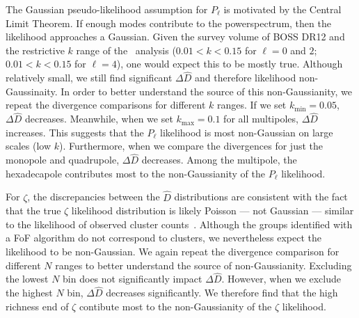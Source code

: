\documentclass[12pt, letterpaper, preprint]{aastex}
\newcommand{\Beut}{\citetalias{beutler2017}}
\begin{document}
The Gaussian pseudo-likelihood assumption for $P_\ell$ is motivated 
by the Central Limit Theorem. If enough modes contribute to the 
powerspectrum, then the likelihood approaches a Gaussian. Given the 
survey volume of BOSS DR12 and the restrictive $k$ range of the \Beut~analysis 
($0.01 < k < 0.15$ for $\ell = 0$ and $2$; $0.01 < k < 0.15$ for $\ell = 4$), 
one would expect this to be mostly true. Although relatively small, we
still find significant $\Delta \hat{D}$ and therefore likelihood non-Gaussinaity. 
In order to better understand the source of this non-Gaussianity, 
we repeat the divergence comparisons 
for different $k$ ranges. If we set $k_\mathrm{min} = 0.05$, $\Delta \hat{D}$ 
decreases. Meanwhile, when we set $k_\mathrm{max} = 0.1$ for all 
multipoles, $\Delta \hat{D}$ increases. This suggests that the $P_\ell$ 
likelihood is most non-Gaussian on large scales (low $k$). Furthermore,
when we compare the divergences for just the monopole and quadrupole, 
$\Delta \hat{D}$ decreases. Among the multipole, the hexadecapole 
contributes most to the non-Gaussianity of the $P_\ell$ likelihood. 

For $\zeta$, the discrepancies between the $\hat{D}$ distributions 
are consistent with the fact that the true $\zeta$ likelihood 
distribution is likely Poisson --- not Gaussian --- similar to the likelihood 
of observed cluster counts~\citep{cash1979,planckcollaboration2014,ade2016}. 
Although the groups identified with a FoF algorithm do not correspond
to clusters, we nevertheless expect the likelihood to be non-Gaussian. 
We again repeat the divergence comparison for different $N$ ranges 
to better understand the source of non-Gaussianity. Excluding the 
lowest $N$ bin does not significantly impact $\Delta \hat{D}$. However, 
when we exclude the highest $N$ bin, $\Delta \hat{D}$ decreases significantly. 
We therefore find that the high richness end of $\zeta$ contibute most to 
the non-Gaussianity of the $\zeta$ likelihood.
\end{document}
